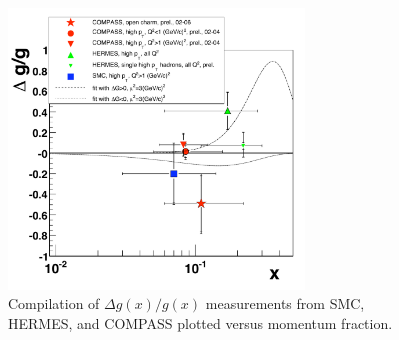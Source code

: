\begin{figure}
  \centering
  \includegraphics[width=0.7\textwidth]{figures/compass_deltag_with_prelim}
  \caption{Compilation of $\Delta g(x)/g(x)$ measurements from SMC, HERMES, and COMPASS plotted versus momentum fraction.}
  \label{fig:pgf-deltag}
\end{figure}


